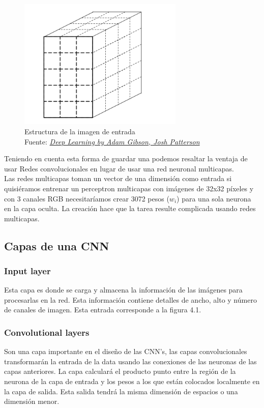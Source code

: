 \begin{figure}[H]
	\centering
	\includegraphics[width=0.7\textwidth]{Figures/image.png}
	\caption{Estructura de la imagen de entrada \\ Fuente:  \href{https://www.safaribooksonline.com/library/view/deep-learning/9781491924570/ch04.html}{\textit{Deep Learning by Adam Gibson, Josh Patterson}}}
	\label{image}
\end{figure} 

Teniendo en cuenta esta forma de guardar una podemos resaltar la ventaja de usar Redes convolucionales en lugar de usar una red neuronal multicapas.\\ Las redes multicapas toman un vector de una dimensión como entrada si quisiéramos entrenar un perceptron multicapas con imágenes de 32x32 píxeles y con 3 canales RGB necesitaríamos crear 3072 pesos ($w_{i}$) para una sola neurona en la capa oculta. La creación hace que la tarea resulte complicada usando redes multicapas.
\subsection{Capas de una CNN}

\subsubsection{Input layer}
Esta capa es donde se carga y almacena la información de las imágenes para procesarlas en la red. Esta información contiene detalles de ancho, alto y número de canales de imagen. Esta entrada corresponde a la figura 4.1.

\subsubsection{Convolutional layers}
Son una capa importante en el diseño de las CNN's, las capas convolucionales transformarán la entrada de la data usando las conexiones de las neuronas de las capas anteriores. La capa calculará el producto punto entre la región de la neurona de la capa de entrada y los pesos a los que están colocados localmente en la capa de salida. Esta salida tendrá la misma dimensión de espacios o una dimensión menor.

